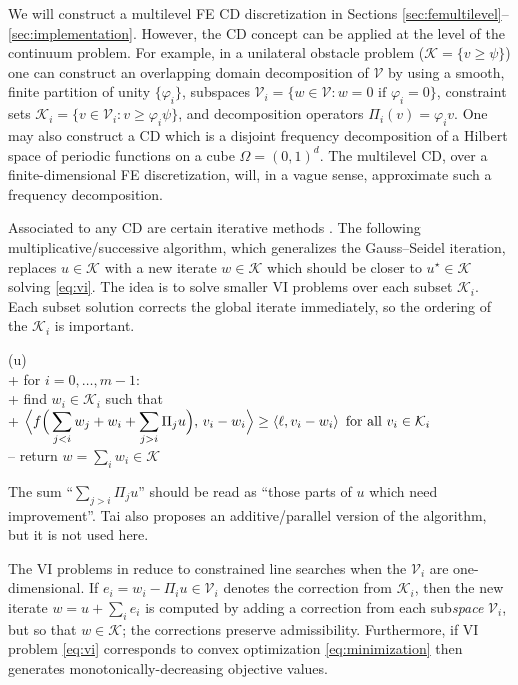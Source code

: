 \documentclass[review,hidelinks,onefignum,onetabnum,final]{siamart220329}  %
\newcommand{\cK}{\mathcal{K}}
\newcommand{\cV}{\mathcal{V}}
\newcommand{\ip}[2]{\left<#1,#2\right>}
\begin{document}
We will construct a multilevel FE CD discretization in Sections \ref{sec:femultilevel}--\ref{sec:implementation}.  However, the CD concept can be applied at the level of the continuum problem.  For example, in a unilateral obstacle problem ($\cK = \{v \ge \psi\}$) one can construct an overlapping domain decomposition of $\cV$ by using a smooth, finite partition of unity $\{\varphi_i\}$, subspaces $\cV_i = \{w \in \cV : w = 0 \text{ if } \varphi_i = 0\}$, constraint sets $\cK_i = \{v \in \cV_i : v \ge \varphi_i \psi\}$, and decomposition operators $\Pi_i(v) = \varphi_i v$.  One may also construct a CD which is a disjoint frequency decomposition of a Hilbert space of periodic functions on a cube $\Omega=(0,1)^d$.  The multilevel CD, over a finite-dimensional FE discretization, will, in a vague sense, approximate such a frequency decomposition.

Associated to any CD are certain iterative methods \cite{Tai2003,Xu1992}.  The following multiplicative/successive  algorithm, which generalizes the Gauss--Seidel iteration, replaces $u \in \cK$ with a new iterate $w\in\cK$ which should be closer to $u^\star \in \cK$ solving \eqref{eq:vi}.  The idea is to solve smaller VI problems over each subset $\cK_i$.  Each subset solution corrects the global iterate immediately, so the ordering of the $\cK_i$ is important.

\begin{pseudo*}
(u)\text{:} \\+
    for $i = 0,\dots,m-1$: \\+
        \rm{find} $w_i\in \cK_i$ \rm{such that} \\+
            $\displaystyle \Big<f\Big(\sum_{j<i} w_j + w_i + \sum_{j>i} \Pi_j u\Big),\, v_i - w_i\Big> \ge \ip{\ell}{v_i - w_i} \textnormal{ for all } v_i \in \cK_i$ \\--
    return $w=\sum_i w_i\in\cK$
\end{pseudo*}

\noindent The sum ``$\sum_{j>i} \Pi_j u$'' should be read as ``those parts of $u$ which need improvement''.  Tai \cite{Tai2003} also proposes an additive/parallel version of the algorithm, but it is not used here.

The VI problems in  reduce to constrained line searches when the $\cV_i$ are one-dimensional.  If $e_i = w_i - \Pi_i u \in \cV_i$ denotes the correction from $\cK_i$, then the new iterate $w = u + \sum_i e_i$ is computed by adding a correction from each sub\emph{space} $\cV_i$, but so that $w \in \cK$; the corrections preserve admissibility.  Furthermore, if VI problem \eqref{eq:vi} corresponds to convex optimization \eqref{eq:minimization} then  generates monotonically-decreasing objective values.
\end{document}
